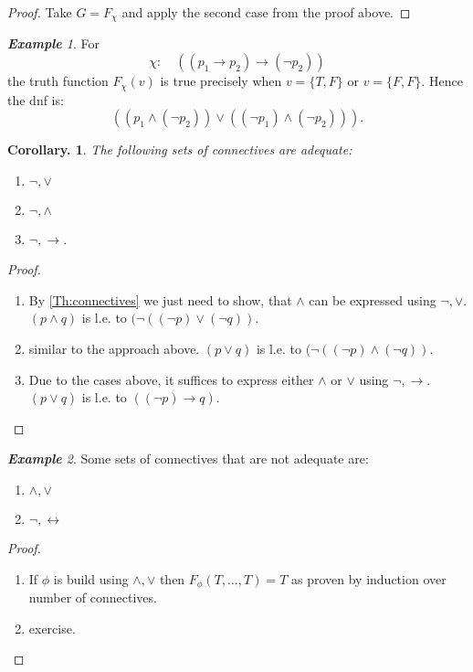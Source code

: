 \documentclass[a4paper,oneside,11pt,DIV=12,parskip=half]{scrartcl}
\theoremstyle{plain}
\newtheorem{corollary}[theorem]{Corollary.}
\theoremstyle{definition}
\newtheorem{remark, definition}[theorem]{Remark and Definition.}
\newtheorem{lemma, definition}[theorem]{Lemma and Definition.}
\newtheorem{theorem, definition}[theorem]{Theorem and Definition.}
\theoremstyle{remark}
\newtheorem*{example}{\textbf{Example}}
\newtheorem*{remark, example}{\textbf{Remark and Exercise}}
\begin{document}
\begin{proof}
Take $G = F_{\chi}$ and apply the second case from the proof above.
\end{proof}
\begin{example} For
\[ \chi: \quad (( p_1 \rightarrow p_2) \rightarrow (\lnot p_2)) \] 
the truth function $F_{\chi}(v)$ is true precisely when $v = \{T,F\}$ or $ v = \{F, F \}$.
Hence the dnf is:
\[ ((p_1 \land (\lnot p_2)) \lor ((\lnot p_1) \land ( \lnot p_2))). \]

\end{example}

\begin{corollary}
The following sets of connectives are adequate:
\begin{enumerate}
    \item $\lnot, \lor$
    \item $\lnot, \land$
    \item $\lnot, \rightarrow$.
\end{enumerate}
\end{corollary}

\begin{proof}
\begin{enumerate}
    \item By \ref{Th:connectives} we just need to show, that $\land$ can be expressed using $\lnot,\lor$. $(p \land q)$ is l.e. to $(\lnot((\lnot p) \lor (\lnot q))$.
    \item similar to the approach above. $(p \lor q)$ is l.e. to $(\lnot((\lnot p) \land (\lnot q))$.
    \item Due to the cases above, it suffices to express either $\land$ or $\lor$ using $\lnot,\rightarrow$. $(p \lor q)$ is l.e. to $((\lnot p) \rightarrow  q)$.
\end{enumerate}
\end{proof}

\begin{example}

Some sets of connectives that are not adequate are:
\begin{enumerate}
    \item $\land, \lor$
    \item $\lnot,\leftrightarrow$
\end{enumerate}
\begin{proof}
\begin{enumerate}
    \item If $\phi$ is build using $\land,\lor$ then 
    $F_\phi(T,\dots,T) = T$ as proven by induction over number of connectives.
    \item exercise.
\end{enumerate}
\end{proof}
\end{example}
\end{document}
